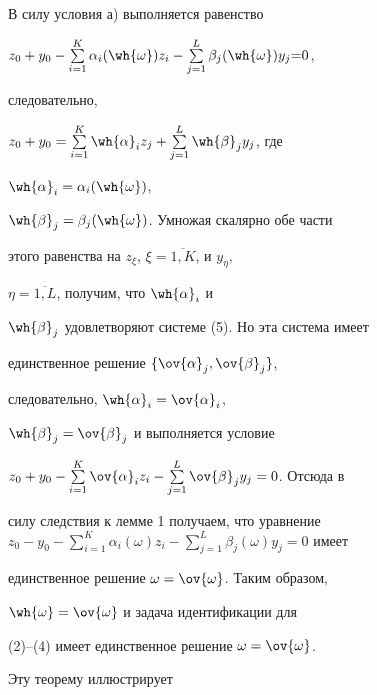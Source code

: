 




\begin{pf}


В силу условия а) выполняется равенство


$z_0+y_0-\sum\limits^K_{i=1}\alpha_i(\wh{\omega})z_i-


\sum\limits^L_{j=1}\beta_j(\wh{\omega})y_j{=}0$,


следовательно,


$z_0+y_0=\sum\limits^K_{i=1}\wh{\alpha}_i z_j+


\sum\limits^L_{j=1}\wh{\beta}_j y_j$, где


$\wh{\alpha}_i=\alpha_i(\wh{\omega})$,


$\wh{\beta}_j=\beta_j(\wh{\omega})$. Умножая скалярно обе части


этого равенства на $z_\xi$, $\xi=\overline{1,K}$, и $y_\eta$,


$\eta=\overline{1,L}$, получим, что $\wh{\alpha}_i$ и


$\wh{\beta}_j$ удовлетворяют системе (5). Но эта система имеет


единственное решение $\{\ov{\alpha}_j,\ov{\beta}_j\}$,


следовательно, $\wh{\alpha}_i=\ov{\alpha}_i$,


$\wh{\beta}_j=\ov{\beta}_j$ и выполняется условие


$z_0+y_0-\sum\limits^K_{i=1}\ov{\alpha}_iz_i-


\sum\limits^L_{j=1}\ov{\beta}_j y_j=0$. Отсюда в


силу следствия к лемме 1 получаем, что уравнение $z_0-y_0 -


\sum\limits^K_{i=1}\alpha_i(\omega)z_i -


\sum\limits^L_{j=1}\beta_j(\omega) y_j=0$ имеет


единственное решение $\omega=\ov{\omega}$. Таким образом,


$\wh{\omega}=\ov{\omega}$ и задача идентификации для


(2)--(4) имеет единственное решение $\omega=\ov{\omega}$.


\end{pf}





Эту теорему иллюстрирует






